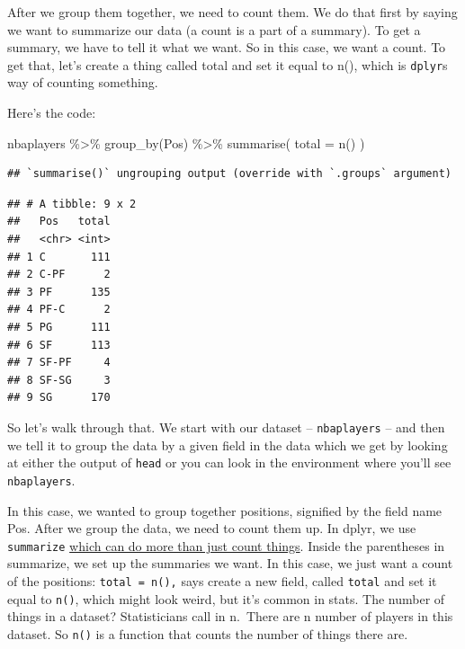 \documentclass[
]{book}
\newenvironment{Shaded}{\begin{snugshade}}{\end{snugshade}}
\newcommand{\AttributeTok}[1]{\textcolor[rgb]{0.77,0.63,0.00}{#1}}
\newcommand{\FunctionTok}[1]{\textcolor[rgb]{0.00,0.00,0.00}{#1}}
\newcommand{\NormalTok}[1]{#1}
\newcommand{\SpecialCharTok}[1]{\textcolor[rgb]{0.00,0.00,0.00}{#1}}
\begin{document}
After we group them together, we need to count them. We do that first by saying we want to summarize our data (a count is a part of a summary). To get a summary, we have to tell it what we want. So in this case, we want a count. To get that, let's create a thing called total and set it equal to n(), which is \texttt{dplyr}s way of counting something.

Here's the code:

\begin{Shaded}
\begin{Highlighting}[]
\NormalTok{nbaplayers }\SpecialCharTok{\%\textgreater{}\%}
  \FunctionTok{group\_by}\NormalTok{(Pos) }\SpecialCharTok{\%\textgreater{}\%}
  \FunctionTok{summarise}\NormalTok{(}
    \AttributeTok{total =} \FunctionTok{n}\NormalTok{()}
\NormalTok{  )}
\end{Highlighting}
\end{Shaded}

\begin{verbatim}
## `summarise()` ungrouping output (override with `.groups` argument)
\end{verbatim}

\begin{verbatim}
## # A tibble: 9 x 2
##   Pos   total
##   <chr> <int>
## 1 C       111
## 2 C-PF      2
## 3 PF      135
## 4 PF-C      2
## 5 PG      111
## 6 SF      113
## 7 SF-PF     4
## 8 SF-SG     3
## 9 SG      170
\end{verbatim}

So let's walk through that. We start with our dataset -- \texttt{nbaplayers} -- and then we tell it to group the data by a given field in the data which we get by looking at either the output of \texttt{head} or you can look in the environment where you'll see \texttt{nbaplayers}.

In this case, we wanted to group together positions, signified by the field name Pos. After we group the data, we need to count them up. In dplyr, we use \texttt{summarize} \href{http://dplyr.tidyverse.org/reference/summarise.html}{which can do more than just count things}. Inside the parentheses in summarize, we set up the summaries we want. In this case, we just want a count of the positions: \texttt{total\ =\ n(),} says create a new field, called \texttt{total} and set it equal to \texttt{n()}, which might look weird, but it's common in stats. The number of things in a dataset? Statisticians call in n.~There are n number of players in this dataset. So \texttt{n()} is a function that counts the number of things there are.
\end{document}

